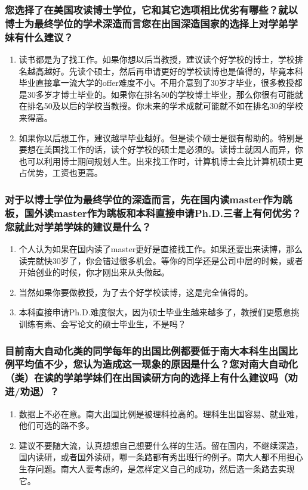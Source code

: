 \documentclass[a4paper,UTF8]{book}
\begin{document}
    \subsubsection*{您选择了在美国攻读博士学位，它和其它选项相比优劣有哪些？就以博士为最终学位的学术深造而言您在出国深造国家的选择上对学弟学妹有什么建议？}
        \begin{enumerate}[itemindent=0pt,itemsep=0pt,parsep=0pt]
            \item 读书都是为了找工作。如果你想以后当教授，建议读个好学校的博士，学校排名越高越好。先读个硕士，然后再申请更好的学校读博也是值得的，毕竟本科毕业直接拿一流大学的offer难度不小。不用介意到了30岁才毕业，很多教授都是30多岁才博士毕业的。如果你在排名50的学校博士毕业，那么你很有可能就在排名50及以后的学校当教授。你未来的学术成就可能就不如在排名30的学校来得高。
            \item 如果你以后想工作，建议越早毕业越好。但是读个硕士是很有帮助的。特别是要想在美国找工作的话，读个好学校的硕士是必须的。读博士就因人而异，你也可以利用博士期间规划人生。出来找工作时，计算机博士会比计算机硕士更占优势，工资也更高。
        \end{enumerate}
    \subsubsection*{对于以博士学位为最终学位的深造而言，先在国内读master作为跳板，国外读master作为跳板和本科直接申请Ph.D.三者上有何优劣？您就此对学弟学妹的建议是什么？}
        \begin{enumerate}[itemindent=0pt,itemsep=0pt,parsep=0pt]
            \item 个人认为如果在国内读了master更好是直接找工作。如果还要出来读博，那么读完就快30岁了，你会错过很多机会。等你的同学还是公司中层的时候，或者开始创业的时候，你才刚出来从头做起。
            \item 当然如果你要做教授，为了去个好学校读博，这是完全值得的。
            \item 本科直接申请Ph.D.难度很大，因为硕士毕业生越来越多了，教授们更愿意挑训练有素、会写论文的硕士毕业生，不是吗？
        \end{enumerate}
    \subsubsection*{目前南大自动化类的同学每年的出国比例都要低于南大本科生出国比例平均值不少，您认为造成这一现象的原因是什么？您对南大自动化（类）在读的学弟学妹们在出国读研方向的选择上有什么建议吗（劝进/劝退）？}
        \begin{enumerate}[itemindent=0pt,itemsep=0pt,parsep=0pt]
            \item 数据上不必在意。南大出国比例是被理科拉高的。理科生出国容易、就业难，他们可选的路不多。
            \item 建议不要随大流，认真想想自己想要什么样的生活。留在国内，不继续深造，国内读研，或者国外读研，哪一条路都有秀出班行的例子。南大人都不用担心生存问题。南大人要考虑的，是怎样定义自己的成功，然后选一条路去实现它。
        \end{enumerate}
\end{document}
